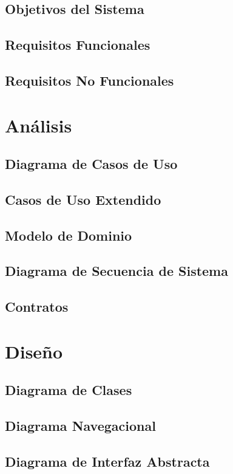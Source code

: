 \documentclass[12pt,a4paper]{book}
\begin{document}
	\chapter[Objetivos]{Objetivos del Sistema}
	
	\chapter{Requisitos Funcionales}
	
	\chapter{Requisitos No Funcionales}
	
	\part{Análisis}
	\chapter{Diagrama de Casos de Uso}
	\chapter{Casos de Uso Extendido}
	\chapter{Modelo de Dominio}
	\chapter{Diagrama de Secuencia de Sistema}
	\chapter{Contratos}
	\part{Diseño}
	\chapter{Diagrama de Clases}
	\chapter{Diagrama Navegacional}
	\chapter{Diagrama de Interfaz Abstracta}
\end{document}
